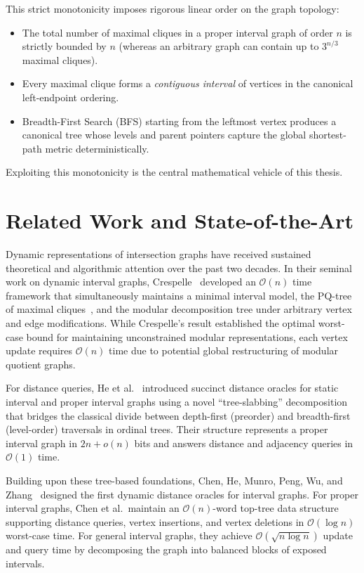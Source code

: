 This strict monotonicity imposes rigorous linear order on the graph topology:
\begin{itemize}
    \item The total number of maximal cliques in a proper interval graph of order $n$ is strictly bounded by $n$ (whereas an arbitrary graph can contain up to $3^{n/3}$ maximal cliques).
    \item Every maximal clique forms a \emph{contiguous interval} of vertices in the canonical left-endpoint ordering.
    \item Breadth-First Search (BFS) starting from the leftmost vertex produces a canonical tree whose levels and parent pointers capture the global shortest-path metric deterministically.
\end{itemize}

Exploiting this monotonicity is the central mathematical vehicle of this thesis.

\section{Related Work and State-of-the-Art}
\label{sec:intro_related_work}

Dynamic representations of intersection graphs have received sustained theoretical and algorithmic attention over the past two decades. In their seminal work on dynamic interval graphs, Crespelle~\cite{crespelle2019fully} developed an $\mathcal{O}(n)$ time framework that simultaneously maintains a minimal interval model, the PQ-tree of maximal cliques~\cite{booth1976testing}, and the modular decomposition tree under arbitrary vertex and edge modifications. While Crespelle's result established the optimal worst-case bound for maintaining unconstrained modular representations, each vertex update requires $\mathcal{O}(n)$ time due to potential global restructuring of modular quotient graphs.

For distance queries, He et al.~\cite{he2020distance} introduced succinct distance oracles for static interval and proper interval graphs using a novel ``tree-slabbing'' decomposition that bridges the classical divide between depth-first (preorder) and breadth-first (level-order) traversals in ordinal trees. Their structure represents a proper interval graph in $2n + o(n)$ bits and answers distance and adjacency queries in $\mathcal{O}(1)$ time. 

Building upon these tree-based foundations, Chen, He, Munro, Peng, Wu, and Zhang~\cite{chen2024distance} designed the first dynamic distance oracles for interval graphs. For proper interval graphs, Chen et al.\ maintain an $\mathcal{O}(n)$-word top-tree data structure supporting distance queries, vertex insertions, and vertex deletions in $\mathcal{O}(\log n)$ worst-case time. For general interval graphs, they achieve $\mathcal{O}(\sqrt{n \log n})$ update and query time by decomposing the graph into balanced blocks of exposed intervals.

